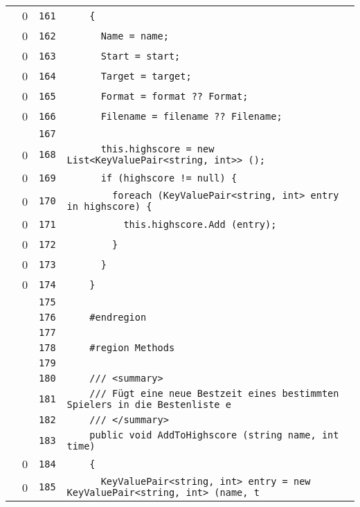 \documentclass[a4paper,10pt]{article}
\begin{document}
\begin{longtable}[l]{lrrl}
\cellcolor{red} & 0 & \verb~161~ & \verb~    {~\\
\cellcolor{red} & 0 & \verb~162~ & \verb~      Name = name;~\\
\cellcolor{red} & 0 & \verb~163~ & \verb~      Start = start;~\\
\cellcolor{red} & 0 & \verb~164~ & \verb~      Target = target;~\\
\cellcolor{red} & 0 & \verb~165~ & \verb~      Format = format ?? Format;~\\
\cellcolor{red} & 0 & \verb~166~ & \verb~      Filename = filename ?? Filename;~\\
\cellcolor{gray} &  & \verb~167~ & \verb~~\\
\cellcolor{red} & 0 & \verb~168~ & \verb~      this.highscore = new List<KeyValuePair<string, int>> ();~\\
\cellcolor{red} & 0 & \verb~169~ & \verb~      if (highscore != null) {~\\
\cellcolor{red} & 0 & \verb~170~ & \verb~        foreach (KeyValuePair<string, int> entry in highscore) {~\\
\cellcolor{red} & 0 & \verb~171~ & \verb~          this.highscore.Add (entry);~\\
\cellcolor{red} & 0 & \verb~172~ & \verb~        }~\\
\cellcolor{red} & 0 & \verb~173~ & \verb~      }~\\
\cellcolor{red} & 0 & \verb~174~ & \verb~    }~\\
\cellcolor{gray} &  & \verb~175~ & \verb~~\\
\cellcolor{gray} &  & \verb~176~ & \verb~    #endregion~\\
\cellcolor{gray} &  & \verb~177~ & \verb~~\\
\cellcolor{gray} &  & \verb~178~ & \verb~    #region Methods~\\
\cellcolor{gray} &  & \verb~179~ & \verb~~\\
\cellcolor{gray} &  & \verb~180~ & \verb~    /// <summary>~\\
\cellcolor{gray} &  & \verb~181~ & \verb~    /// Fügt eine neue Bestzeit eines bestimmten Spielers in die Bestenliste e~\\
\cellcolor{gray} &  & \verb~182~ & \verb~    /// </summary>~\\
\cellcolor{gray} &  & \verb~183~ & \verb~    public void AddToHighscore (string name, int time)~\\
\cellcolor{red} & 0 & \verb~184~ & \verb~    {~\\
\cellcolor{red} & 0 & \verb~185~ & \verb~      KeyValuePair<string, int> entry = new KeyValuePair<string, int> (name, t~\\

\end{longtable}
\end{document}
